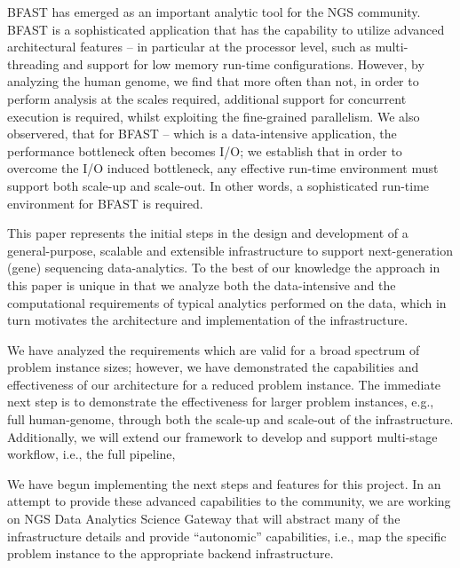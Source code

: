 \documentclass{acm_proc_article-sp}
\begin{document}
BFAST has emerged as an important analytic tool for the NGS
community. BFAST is a sophisticated application that has the
capability to utilize advanced architectural features -- in particular
at the processor level, such as multi-threading and support for low
memory run-time configurations. However, by analyzing the human
genome, we find that more often than not, in order to perform analysis
at the scales required, additional support for concurrent execution is
required, whilst exploiting the fine-grained parallelism. We also
observered, that for BFAST -- which is a data-intensive application,
the performance bottleneck often becomes I/O; we establish that in
order to overcome the I/O induced bottleneck, any effective run-time
environment must support both scale-up and scale-out. In other words,
a sophisticated run-time environment for BFAST is required.

This paper represents the initial steps in the design and development
of a general-purpose, scalable and extensible infrastructure to
support next-generation (gene) sequencing data-analytics. To the best
of our knowledge the approach in this paper is unique in that we
analyze both the data-intensive and the computational requirements of
typical analytics performed on the data, which in turn motivates the
architecture and implementation of the infrastructure. 

We have analyzed the requirements which are valid for a broad spectrum
of problem instance sizes; however, we have demonstrated the
capabilities and effectiveness of our architecture for a reduced
problem instance. The immediate next step is to demonstrate the
effectiveness for larger problem instances, e.g., full human-genome,
through both the scale-up and scale-out of the infrastructure.
Additionally, we will extend our framework to develop and support
multi-stage workflow, i.e., the full pipeline,
 
We have begun implementing the next steps and features for this
project. In an attempt to provide these advanced capabilities to the
community, we are working on NGS Data Analytics Science Gateway that
will abstract many of the infrastructure details and provide
``autonomic'' capabilities, i.e., map the specific problem instance to
the appropriate backend infrastructure.

\end{document}
